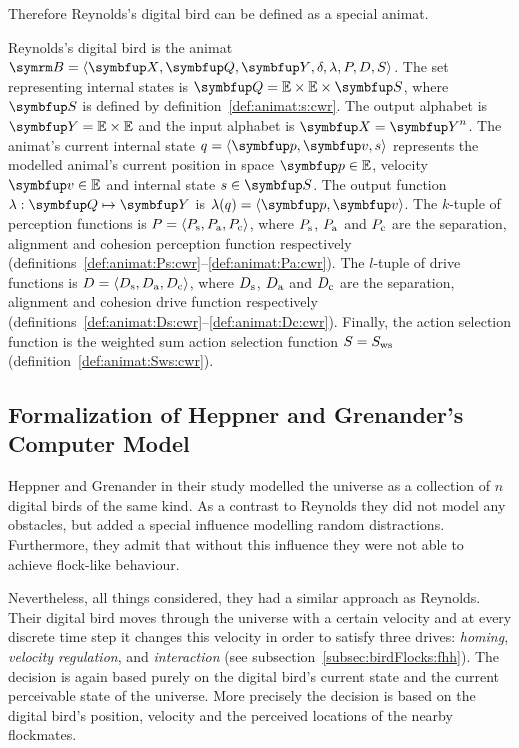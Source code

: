 Therefore Reynolds's digital bird can be defined as a special animat. 

\begin{definition}
	\label{def:animat:cwr}
	Reynolds's digital bird is the animat $\autom{B}=\langle\set{X},\set{Q},\set{Y},\delta,\lambda,P,D,S\rangle$. The set representing internal states is $\set{Q}=\E \times \E \times \set{S}$, where $\set{S}$ is defined by definition~\ref{def:animat:s:cwr}. The output alphabet is $\set{Y}=\E \times \E$ and the input alphabet is $\set{X}=\set{Y}^n$. The animat's current internal state $q=\langle\vect{p},\vect{v},s\rangle$ represents the modelled animal's current position in space $\vect{p} \in \E$, velocity $\vect{v} \in \E$ and internal state $s \in \set{S}$. The output function $\lambda: \set{Q} \mapsto \set{Y}$ is $\lambda(q)=\langle\vect{p},\vect{v}\rangle$. The $k$-tuple of perception functions is $P=\langle P_\textnormal{s},P_\textnormal{a},P_\textnormal{c}\rangle$, where $P_\textnormal{s}$, $P_\textnormal{a}$ and $P_\textnormal{c}$ are the separation, alignment and cohesion perception function respectively (definitions~\ref{def:animat:Ps:cwr}--\ref{def:animat:Pa:cwr}). The $l$-tuple of drive functions is $D=\langle D_\textnormal{s},D_\textnormal{a},D_\textnormal{c}\rangle$, where $D_\textnormal{s}$, $D_\textnormal{a}$ and $D_\textnormal{c}$ are the separation, alignment and cohesion drive function respectively (definitions~\ref{def:animat:Ds:cwr}--\ref{def:animat:Dc:cwr}). Finally, the action selection function is the weighted sum action selection function $S=S_\textnormal{ws}$ (definition~\ref{def:animat:Sws:cwr}).
\end{definition}

\subsection{Formalization of Heppner and Grenander's Computer Model}
\label{subsec:animat:fhh}
Heppner and Grenander in their study \cite{heppner:1990} modelled the universe as a collection of $n$ digital birds of the same kind. As a contrast to Reynolds they did not model any obstacles, but added a special influence modelling random distractions. Furthermore, they admit that without this influence they were not able to achieve flock-like behaviour.

Nevertheless, all things considered, they had a similar approach as Reynolds. Their digital bird moves through the universe with a certain velocity and at every discrete time step it changes this velocity in order to satisfy three drives: \emph{homing}, \emph{velocity regulation}, and \emph{interaction} (see subsection~\ref{subsec:birdFlocks:fhh}). The decision is again based purely on the digital bird's current state and the current perceivable state of the universe. More precisely the decision is based on the digital bird's position, velocity and the perceived locations of the nearby flockmates. 

